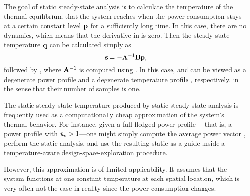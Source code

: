 The goal of static steady-state analysis is to calculate the temperature of the
thermal equilibrium that the system reaches when the power consumption stays at
a certain constant level $\mathbf{p}$ for a sufficiently long time. In this case, there
are no dynamics, which means that the derivative in
 is zero. Then the steady-state temperature $\mathbf{q}$
can be calculated simply as
\begin{equation} \elab{static-steady-state}
  \vs = -\m{A}^{-1} \m{B} \vp,
\end{equation}
followed by , where $\mathbf{A}^{-1}$ is computed using
. In this case, \vp and \vq can be viewed as a degenerate
power profile \mp and a degenerate temperature profile \mq, respectively, in the
sense that their number of samples \ns is one.

The static steady-state temperature produced by static steady-state analysis is
frequently used as a computationally cheap approximation of the system's thermal
behavior. For instance, given a full-fledged power profile \mp---that is, a
power profile with ${n_\mathrm{s}} > 1$---one might simply compute the average power vector
\vp, perform the static analysis, and use the resulting static \vq as a guide
inside a temperature-aware design-space-exploration procedure.

However, this approximation is of limited applicability. It assumes that the
system functions at one constant temperature at each spatial location, which is
very often not the case in reality since the power consumption changes.

